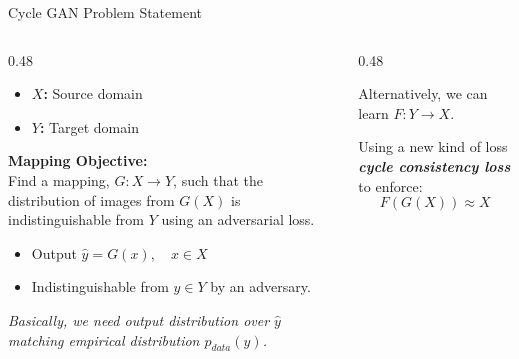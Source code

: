 \documentclass[aspectratio=169,xcolor=dvipsnames,svgnames,x11names,fleqn]{beamer}
\begin{document}
\begin{frame}{Cycle GAN Problem Statement}

\footnotesize

    \begin{columns}[T]
        \begin{column}{0.48\textwidth}
            \begin{tcolorbox}[theorybox, title=Domain Definition]
                \begin{itemize}
                    \item \textbf{$X$:} Source domain
                    \item \textbf{$Y$:} Target domain
                \end{itemize}
            \end{tcolorbox}

            \vspace{0.25em}
            
     
            \textbf{Mapping Objective:} \\
            Find a mapping, $G:X \to Y$, such that the distribution of images from $G(X)$ is indistinguishable from $Y$ using an adversarial loss.
            
            \begin{itemize}
                \item Output $\hat{y}=G(x), \quad x \in X$
                \item Indistinguishable from $y \in Y$ by an adversary.
            \end{itemize}
            
            \vspace{0.3em}
            \textit{Basically, we need output distribution over $\hat{y}$ matching empirical distribution $p_{data}(y)$.}
        \end{column}

        \begin{column}{0.48\textwidth}
            \begin{tcolorbox}[theorybox, title=Dual Mapping, colframe=SlateGray!80]
                Alternatively, we can learn $F: Y \to X$.
            \end{tcolorbox}

            \small
            Using a new kind of loss \textbf{\textit{cycle consistency loss}} to enforce:
            \[ F(G(X)) \approx X \]


\end{column}
\end{columns}
\end{frame}
\end{document}
